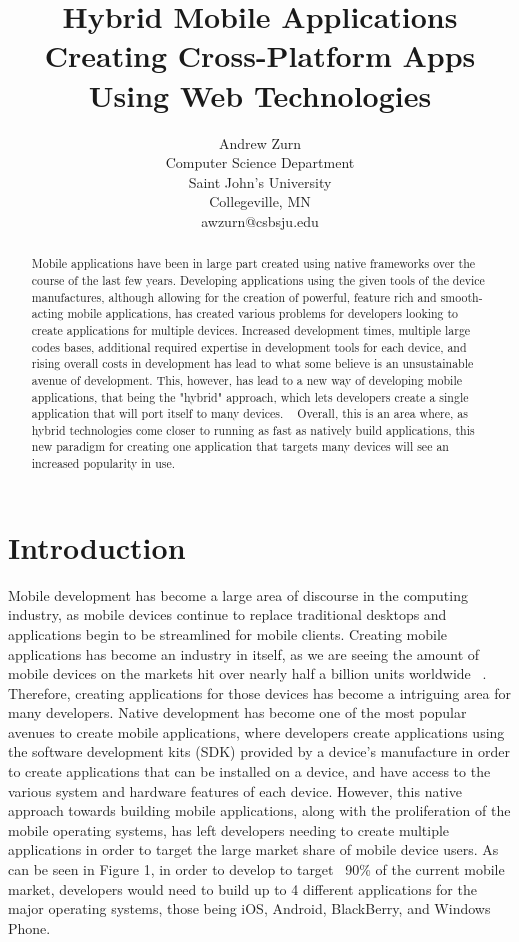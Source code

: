 \documentclass[11pt, twocolumn]{article}
\title{Hybrid Mobile Applications \\ Creating Cross-Platform Apps Using Web Technologies}
\author[1]{Andrew Zurn\\Computer Science Department\\Saint John's University\\Collegeville, MN\\awzurn@csbsju.edu}
\begin{document}
\maketitle
\tableofcontents
\begin{abstract}
Mobile applications have been in large part created using native frameworks over the course of the last few years.  Developing applications using the given tools of the device manufactures, although allowing for the creation of powerful, feature rich and smooth-acting mobile applications, has created various problems for developers looking to create applications for multiple devices.  Increased development times, multiple large codes bases, additional required expertise in development tools for each device, and rising overall costs in development has lead to what some believe is an unsustainable avenue of development. This, however, has lead to a new way of developing mobile applications, that being the "hybrid" approach, which lets developers create a single application that will port itself to many devices. ~\cite{Corral2011}  Overall, this is an area where, as hybrid technologies come closer to running as fast as natively build applications, this new paradigm for creating one application that targets many devices will see an increased popularity in use.
\end{abstract}

\section{Introduction}
Mobile development has become a large area of discourse in the computing industry, as mobile devices continue to replace traditional desktops and applications begin to be streamlined for mobile clients.  Creating mobile applications has become an industry in itself, as we are seeing the amount of mobile devices on the markets hit over nearly half a billion units worldwide ~\cite{Llamas2013}.  Therefore, creating applications for those devices has become a intriguing area for many developers. Native development has become one of the most popular avenues to create mobile applications, where developers create applications using the software development kits (SDK) provided by a device's manufacture in order to create applications that can be installed on a device, and have access to the various system and hardware features of each device.  However, this native approach towards building mobile applications, along with the proliferation of the mobile operating systems, has left developers needing to create multiple applications in order to target the large market share of mobile device users.  As can be seen in Figure 1, in order to develop to target ~90\% of the current mobile market, developers would need to build up to 4 different applications for the major operating systems, those being iOS, Android, BlackBerry, and Windows Phone. ~\cite{NetMarketShare2013}\\  
\end{document}
